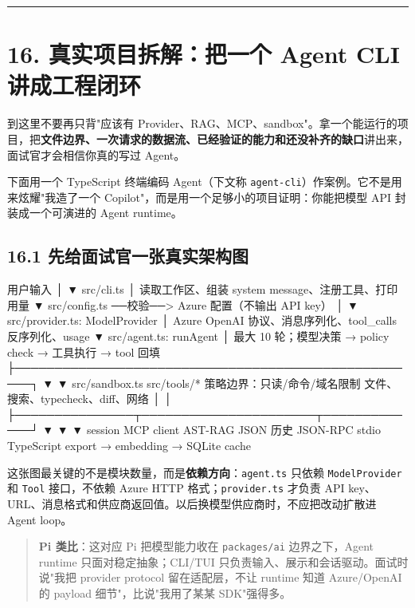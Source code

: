 \bigskip\hrule\bigskip

\section{16. 真实项目拆解：把一个 Agent CLI 讲成工程闭环}

到这里不要再只背"应该有 Provider、RAG、MCP、sandbox"。拿一个能运行的项目，把\textbf{文件边界、一次请求的数据流、已经验证的能力和还没补齐的缺口}讲出来，面试官才会相信你真的写过 Agent。

下面用一个 TypeScript 终端编码 Agent（下文称 \texttt{agent-cli}）作案例。它不是用来炫耀"我造了一个 Copilot"，而是用一个足够小的项目证明：你能把模型 API 封装成一个可演进的 Agent runtime。

\subsection{16.1 先给面试官一张真实架构图}

\begin{codeblock}
用户输入
   │
   ▼
src/cli.ts
   │  读取工作区、组装 system message、注册工具、打印用量
   ▼
src/config.ts ──校验──> Azure 配置（不输出 API key）
   │
   ▼
src/provider.ts: ModelProvider
   │  Azure OpenAI 协议、消息序列化、tool_calls 反序列化、usage
   ▼
src/agent.ts: runAgent
   │  最大 10 轮；模型决策 → policy check → 工具执行 → tool 回填
   ├────────────────────────────────────────────────────┐
   ▼                                                    ▼
src/sandbox.ts                                     src/tools/*
策略边界：只读/命令/域名限制                    文件、搜索、typecheck、diff、网络
   │                                                    │
   ├───────────────┬──────────────────────┬─────────────┘
   ▼               ▼                      ▼
session        MCP client               AST-RAG
JSON 历史      JSON-RPC stdio           TypeScript export → embedding → SQLite cache
\end{codeblock}

这张图最关键的不是模块数量，而是\textbf{依赖方向}：\texttt{agent.ts} 只依赖 \texttt{ModelProvider} 和 \texttt{Tool} 接口，不依赖 Azure HTTP 格式；\texttt{provider.ts} 才负责 API key、URL、消息格式和供应商返回值。以后换模型供应商时，不应把改动扩散进 Agent loop。

\begin{quote}
\textbf{Pi 类比}：这对应 Pi 把模型能力收在 \texttt{packages/ai} 边界之下，Agent runtime 只面对稳定抽象；CLI/TUI 只负责输入、展示和会话驱动。面试时说"我把 provider protocol 留在适配层，不让 runtime 知道 Azure/OpenAI 的 payload 细节"，比说"我用了某某 SDK"强得多。
\end{quote}

